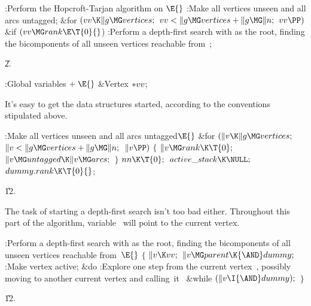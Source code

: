 \Y\B\4:Perform the Hopcroft-Tarjan algorithm on \X${}\E{}$\6
:Make all vertices unseen and all arcs untagged\X;\6
\&{for} ${}(\\{vv}\K\|g\MG\\{vertices};{}$ ${}\\{vv}<\|g\MG\\{vertices}+\|g\MG%
\|n;{}$ ${}\\{vv}\PP){}$\1\6
\&{if} ${}(\\{vv}\MG\\{rank}\E\T{0}{}$)\1\6
:Perform a depth-first search with  as the root, finding the
bicomponents of all unseen vertices reachable from~\X;\2\2\par
\U2.\fi

\B{}:Global variables\X${}\mathrel+\E{}$\6
\&{Vertex} ${}{*}\\{vv}{}$;\par
\fi

It's easy to get the data structures started, according to the
conventions stipulated above.

\Y\B\4:Make all vertices unseen and all arcs untagged\X${}\E{}$\6
\&{for} ${}(\|v\K\|g\MG\\{vertices};{}$ ${}\|v<\|g\MG\\{vertices}+\|g\MG\|n;{}$
${}\|v\PP){}$\5
${}\{{}$\1\6
${}\|v\MG\\{rank}\K\T{0};{}$\6
${}\|v\MG\\{untagged}\K\|v\MG\\{arcs};{}$\6
\4${}\}{}$\2\6
${}\\{nn}\K\T{0};{}$\6
${}\\{active\_stack}\K\NULL;{}$\6
${}\\{dummy}.\\{rank}\K\T{0}{}$;\par
\U12.\fi

The task of starting a depth-first search isn't too bad either.
Throughout
this part of the algorithm, variable~ will point to the current vertex.

\Y\B\4:Perform a depth-first search with  as the root, finding
the bicomponents of all unseen vertices reachable from~\X${}\E{}$\6
${}\{{}$\1\6
${}\|v\K\\{vv};{}$\6
${}\|v\MG\\{parent}\K{\AND}\\{dummy};{}$\6
:Make vertex  active\X;\6
\&{do}\5
:Explore one step from the current vertex~, possibly moving to
another current vertex and calling~it~\X\5
\&{while} ${}(\|v\I{\AND}\\{dummy});{}$\6
\4${}\}{}$\2\par
\U12.\fi

